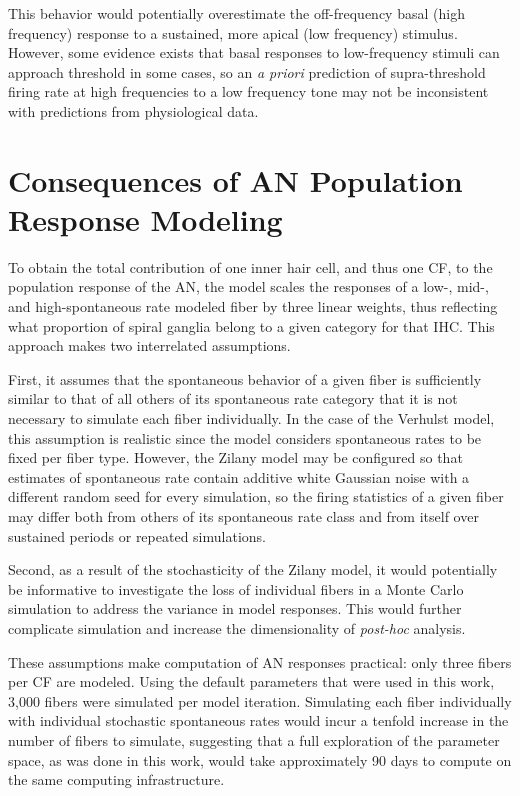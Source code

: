 This behavior would potentially overestimate the off-frequency basal (high frequency) response to a sustained, more apical (low frequency) stimulus.  However, some evidence exists \citep{Kiang1974Tails,Yates1990Basilar} that basal responses to low-frequency stimuli can approach threshold in some cases, so an \emph{a priori} prediction of supra-threshold firing rate at high frequencies to a low frequency tone may not be inconsistent with predictions from physiological data.

\section{Consequences of AN Population Response Modeling} %
\label{sec:consequences_of_percentage_weighting_degradation_for_synaptopathy}
To obtain the total contribution of one inner hair cell, and thus one CF, to the population response of the AN, the model scales the responses of a low-, mid-, and high-spontaneous rate modeled fiber by three linear weights, thus reflecting what proportion of spiral ganglia belong to a given category for that IHC. This approach makes two interrelated assumptions.  

First, it assumes that the spontaneous behavior of a given fiber is sufficiently similar to that of all others of its spontaneous rate category that it is not necessary to simulate each fiber individually.  In the case of the Verhulst model, this assumption is realistic since the model considers spontaneous rates to be fixed per fiber type.  However, the Zilany model may be configured so that estimates of spontaneous rate contain additive white Gaussian noise with a different random seed for every simulation, so the firing statistics of a given fiber may differ both from others of its spontaneous rate class and from itself over sustained periods or repeated simulations.

Second, as a result of the stochasticity of the Zilany model, it would potentially be informative to investigate the loss of individual fibers in a Monte Carlo simulation to address the variance in model responses.  This would further complicate simulation and increase the dimensionality of \emph{post-hoc} analysis. 

These assumptions make computation of AN responses practical: only three fibers per CF are modeled.  Using the default parameters that were used in this work, 3,000 fibers were simulated per model iteration.  Simulating each fiber individually with individual stochastic spontaneous rates would incur a tenfold increase in the number of fibers to simulate, suggesting that a full exploration of the parameter space, as was done in this work, would take approximately 90 days to compute on the same computing infrastructure.

